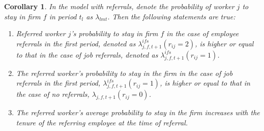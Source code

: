 \documentclass[12pt]{article}
\newtheorem{corollary}[theorem]{Corollary}
\begin{document}
\begin{corollary}\label{cor:referrals_turnover}
In the model with referrals, denote the probability of worker $j$ to stay in firm $f$ in period $t_l$ as $\lambda_{lmt}$. Then the following statements are true:
    \begin{enumerate}[label={\roman*})]
        \item Referred worker $j$'s probability to stay in firm $f$ in the case of employee referrals in the first period, denoted as $\lambda_{j,f,t+1}^{ifs}(r_{ij}=2)$, is higher or equal to that in the case of job referrals, denoted as $\lambda_{j,f,t+1}^{ifs}(r_{ij}=1)$.
        \item The referred worker's probability to stay in  the firm in the case of job referrals in the first period, $\lambda_{j,f,t+1}^{ifs}(r_{ij}=1)$, is higher or equal to that in the case of no referrals, $\lambda_{j,f,t+1}(r_{ij}=0)$.
        \item The referred worker's average probability to stay in the firm increases with the tenure of the referring employee at the time of referral.
    \end{enumerate}
\end{corollary} 











\end{document}
